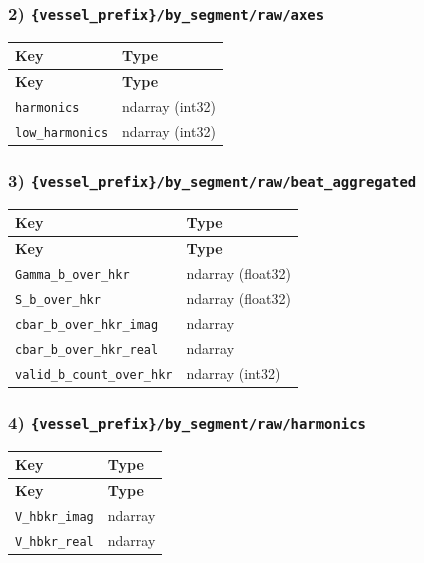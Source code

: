 \documentclass[11pt]{article}
\begin{document}
\subsubsection*{2) \texttt{\{vessel\_\allowbreak{}prefix\}/\allowbreak{}by\_\allowbreak{}segment/\allowbreak{}raw/\allowbreak{}axes}}
\begin{longtable}{|p{}|p{}|}
\hline
\textbf{Key} & \textbf{Type} \\ \hline
\endfirsthead
\hline
\textbf{Key} & \textbf{Type} \\ \hline
\endhead
\texttt{harmonics} & ndarray (int32) \\ \hline
\texttt{low\_\allowbreak{}harmonics} & ndarray (int32) \\ \hline
\end{longtable}

\subsubsection*{3) \texttt{\{vessel\_\allowbreak{}prefix\}/\allowbreak{}by\_\allowbreak{}segment/\allowbreak{}raw/\allowbreak{}beat\_\allowbreak{}aggregated}}
\begin{longtable}{|p{}|p{}|}
\hline
\textbf{Key} & \textbf{Type} \\ \hline
\endfirsthead
\hline
\textbf{Key} & \textbf{Type} \\ \hline
\endhead
\texttt{Gamma\_\allowbreak{}b\_\allowbreak{}over\_\allowbreak{}hkr} & ndarray (float32) \\ \hline
\texttt{S\_\allowbreak{}b\_\allowbreak{}over\_\allowbreak{}hkr} & ndarray (float32) \\ \hline
\texttt{cbar\_\allowbreak{}b\_\allowbreak{}over\_\allowbreak{}hkr\_\allowbreak{}imag} & ndarray \\ \hline
\texttt{cbar\_\allowbreak{}b\_\allowbreak{}over\_\allowbreak{}hkr\_\allowbreak{}real} & ndarray \\ \hline
\texttt{valid\_\allowbreak{}b\_\allowbreak{}count\_\allowbreak{}over\_\allowbreak{}hkr} & ndarray (int32) \\ \hline
\end{longtable}

\subsubsection*{4) \texttt{\{vessel\_\allowbreak{}prefix\}/\allowbreak{}by\_\allowbreak{}segment/\allowbreak{}raw/\allowbreak{}harmonics}}
\begin{longtable}{|p{}|p{}|}
\hline
\textbf{Key} & \textbf{Type} \\ \hline
\endfirsthead
\hline
\textbf{Key} & \textbf{Type} \\ \hline
\endhead
\texttt{V\_\allowbreak{}hbkr\_\allowbreak{}imag} & ndarray \\ \hline
\texttt{V\_\allowbreak{}hbkr\_\allowbreak{}real} & ndarray \\ \hline
\end{longtable}
\end{document}
